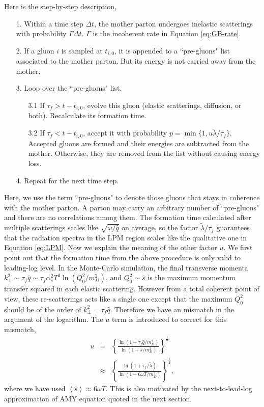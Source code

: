 \documentclass[aps, prc, reprint, amsmath, groupedaddress, nofootinbib]{revtex4-1}
\begin{document}
Here is the step-by-step description,
\begin{itemize}
\item[1.] Within a time step $\Delta t$, the mother parton undergoes inelastic scatterings with probability $\Gamma\Delta t$. $\Gamma$ is the incoherent rate in Equation \ref{eq:GB-rate}.
\item[2.] If a gluon $i$ is sampled at $t_{i,0}$, it is appended to a ``pre-gluons" list associated to the mother parton. But its energy is not carried away from the mother.
\item[3.] Loop over the ``pre-gluons" list. 
\begin{itemize}
\item[3.1] If $\tau_f > t-t_{i,0}$, evolve this gluon (elastic scatterings, diffusion, or both). Recalculate its formation time.
\item[3.2] If $\tau_f < t-t_{i,0}$, accept it with probability $p = \min\{1, u\tilde{\lambda}/\tau_f\}$. Accepted gluons are formed and their energies are subtracted from the mother. Otherwise, they are removed from the list without causing energy loss.
\end{itemize} 
\item[4.] Repeat for the next time step.
\end{itemize}
Here, we use the term ``pre-gluons" to denote those gluons that stays in coherence with the mother parton.
A parton may carry an arbitrary number of ``pre-gluons" and there are no correlations among them.
The formation time calculated after multiple scatterings scales like $\sqrt{\omega/\hat{q}}$ on average, so the factor $\tilde{\lambda}/\tau_f$ guarantees that the radiation spectra in the LPM region scales like the qualitative one in Equation \ref{eq:LPM}.
Now we explain the meaning of the other factor $u$.
We first point out that the formation time from the above procedure is only valid to leading-log level.
In the Monte-Carlo simulation, the final transverse momenta $k_\perp^2\sim \tau_f \hat{q} \sim \tau_f \alpha_s^2 T^3 \ln(Q_0^2/m_D^2)$, 
and $Q_0^2\sim \hat{s}$ is the maximum momentum transfer squared in each elastic scattering.
However from a total coherent point of view, these re-scatterings acts like a single one except that the maximum $Q_0^2$ should be of the order of $k_\perp^2 = \tau_f \hat{q}$.
Therefore we have an mismatch in the argument of the logarithm.
The $u$ term is introduced to correct for this mismatch,
\begin{eqnarray}
\nonumber
u &=& \left\{\frac{\ln\left(1+\tau_f\hat{q}/m_D^2\right)}{\ln\left(1+\hat{s}/m_D^2\right)}\right\}^{\frac{1}{2}}\\
&\approx& \left\{\frac{\ln\left(1+\tau_f/\tilde{\lambda}\right)}{\ln\left(1+6\omega T/m_D^2\right)}\right\}^{\frac{1}{2}},
\end{eqnarray} 
where we have used $\left\langle\hat{s}\right\rangle \approx 6 \omega T$.
This is also motivated by the next-to-lead-log approximation of AMY equation quoted in the next section.
\end{document}
